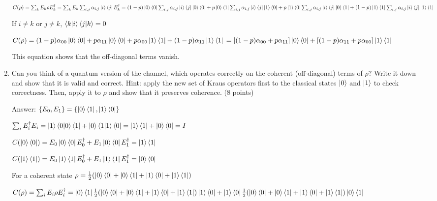 \documentclass{article}
\begin{document}
\begin{enumerate}
          $C(\rho)=\sum_k E_k\rho E_k^\dagger
              \\=\sum_k E_k\sum_{i,j} \alpha_{i,j} \ket{i}\bra{j} E_k^\dagger
              \\=(1-p)\ket{0}\bra{0}\sum_{i,j} \alpha_{i,j} \ket{i}\bra{j}\ket{0}\bra{0}+p\ket{0}\bra{1}\sum_{i,j} \alpha_{i,j} \ket{i}\bra{j}\ket{1}\bra{0}+p\ket{1}\bra{0}\sum_{i,j} \alpha_{i,j} \ket{i}\bra{j}\ket{0}\bra{1}+(1-p)\ket{1}\bra{1}\sum_{i,j} \alpha_{i,j} \ket{i}\bra{j}\ket{1}\bra{1}
          $

          If $i\neq k$ or $j\neq k$, $\braket{k|i}\braket{j|k}=0$

          $C(\rho)=(1-p)\alpha_{00}\ket{0}\bra{0}+p\alpha_{11}\ket{0}\bra{0}+p\alpha_{00}\ket{1}\bra{1}+(1-p)\alpha_{11}\ket{1}\bra{1}
              \\=[(1-p)\alpha_{00}+p\alpha_{11}]\ket{0}\bra{0}+[(1-p)\alpha_{11}+p\alpha_{00}]\ket{1}\bra{1}
          $

          This equation shows that the off-diagonal terms vanish.


    \item Can you think of a quantum version of the channel, which operates correctly on the coherent (off-diagonal) terms of $\rho$? Write it down and show that it is valid and correct. Hint: apply the new set of Kraus operators first to the classical states $\ket{0}$ and $\ket{1}$ to check correctness. Then, apply it to $\rho$ and show that it preserves coherence. (8 points)

          Answer: $\{E_0,E_1\}=\{\ket{0}\bra{1},\ket{1}\bra{0}\}$

          $\sum_i E_i^\dagger E_i=\ket{1}\braket{0|0}\bra{1}+\ket{0}\braket{1|1}\bra{0}=\ket{1}\bra{1}+\ket{0}\bra{0}=I$

          $C(\ket{0}\bra{0})=E_0\ket{0}\bra{0}E_0^\dagger+E_1\ket{0}\bra{0}E_1^\dagger=\ket{1}\bra{1}$

          $C(\ket{1}\bra{1})=E_0\ket{1}\bra{1}E_0^\dagger+E_1\ket{1}\bra{1}E_1^\dagger=\ket{0}\bra{0}$

          For a coherent state $\rho=\frac{1}{2}(\ket{0}\bra{0}+\ket{0}\bra{1}+\ket{1}\bra{0}+\ket{1}\bra{1})$

          $C(\rho)=\sum_i E_i\rho E_i^\dagger=\ket{0}\bra{1}\frac{1}{2}(\ket{0}\bra{0}+\ket{0}\bra{1}+\ket{1}\bra{0}+\ket{1}\bra{1})\ket{1}\bra{0}+\ket{1}\bra{0}\frac{1}{2}(\ket{0}\bra{0}+\ket{0}\bra{1}+\ket{1}\bra{0}+\ket{1}\bra{1})\ket{0}\bra{1}$
\end{enumerate}
\end{document}
